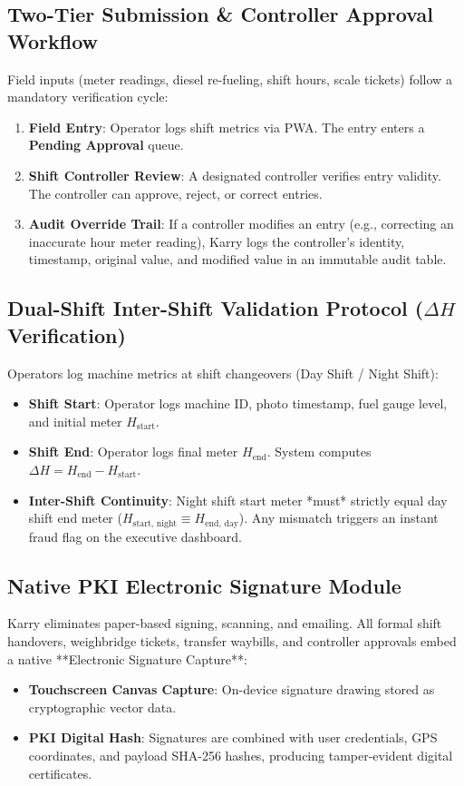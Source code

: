 \documentclass[11pt, a4paper]{article}
\begin{document}
\subsection{Two-Tier Submission \& Controller Approval Workflow}
Field inputs (meter readings, diesel re-fueling, shift hours, scale tickets) follow a mandatory verification cycle:
\begin{enumerate}
    \item \textbf{Field Entry}: Operator logs shift metrics via PWA. The entry enters a \textbf{Pending Approval} queue.
    \item \textbf{Shift Controller Review}: A designated controller verifies entry validity. The controller can approve, reject, or correct entries.
    \item \textbf{Audit Override Trail}: If a controller modifies an entry (e.g., correcting an inaccurate hour meter reading), Karry logs the controller's identity, timestamp, original value, and modified value in an immutable audit table.
\end{enumerate}

\subsection{Dual-Shift Inter-Shift Validation Protocol ($\Delta H$ Verification)}
Operators log machine metrics at shift changeovers (Day Shift / Night Shift):
\begin{itemize}
    \item \textbf{Shift Start}: Operator logs machine ID, photo timestamp, fuel gauge level, and initial meter $H_{\text{start}}$.
    \item \textbf{Shift End}: Operator logs final meter $H_{\text{end}}$. System computes $\Delta H = H_{\text{end}} - H_{\text{start}}$.
    \item \textbf{Inter-Shift Continuity}: Night shift start meter *must* strictly equal day shift end meter ($H_{\text{start, night}} \equiv H_{\text{end, day}}$). Any mismatch triggers an instant fraud flag on the executive dashboard.
\end{itemize}

\subsection{Native PKI Electronic Signature Module}
Karry eliminates paper-based signing, scanning, and emailing. All formal shift handovers, weighbridge tickets, transfer waybills, and controller approvals embed a native **Electronic Signature Capture**:
\begin{itemize}
    \item \textbf{Touchscreen Canvas Capture}: On-device signature drawing stored as cryptographic vector data.
    \item \textbf{PKI Digital Hash}: Signatures are combined with user credentials, GPS coordinates, and payload SHA-256 hashes, producing tamper-evident digital certificates.
\end{itemize}
\end{document}
